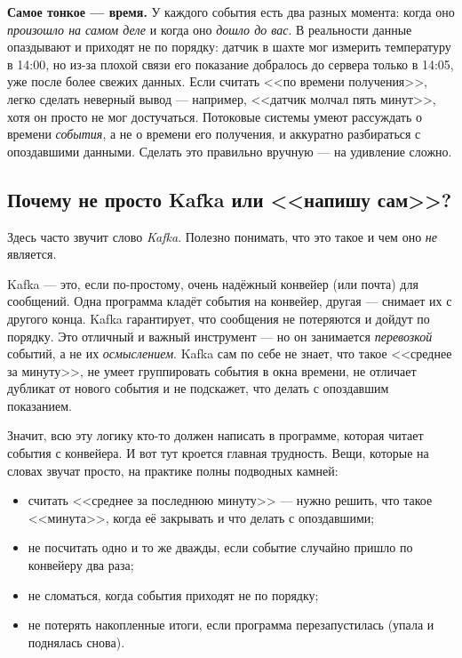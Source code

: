 \documentclass[11pt,a4paper]{article}
\begin{document}
\textbf{Самое тонкое --- время.} У каждого события есть два разных
момента: когда оно \emph{произошло на самом деле} и когда оно
\emph{дошло до вас}. В реальности данные опаздывают и приходят не по
порядку: датчик в шахте мог измерить температуру в 14:00, но из-за
плохой связи его показание добралось до сервера только в 14:05, уже
после более свежих данных. Если считать <<по времени получения>>, легко
сделать неверный вывод --- например, <<датчик молчал пять минут>>, хотя
он просто не мог достучаться. Потоковые системы умеют рассуждать о
времени \emph{события}, а не о времени его получения, и аккуратно
разбираться с опоздавшими данными. Сделать это правильно вручную ---
на удивление сложно.

\subsection{Почему не просто Kafka или <<напишу сам>>?}

Здесь часто звучит слово \emph{Kafka}. Полезно понимать, что это такое
и чем оно \emph{не} является.

Kafka --- это, если по-простому, очень надёжный конвейер (или почта)
для сообщений. Одна программа кладёт события на конвейер, другая ---
снимает их с другого конца. Kafka гарантирует, что сообщения не
потеряются и дойдут по порядку. Это отличный и важный инструмент --- но
он занимается \emph{перевозкой} событий, а не их \emph{осмыслением}.
Kafka сам по себе не знает, что такое <<среднее за минуту>>, не умеет
группировать события в окна времени, не отличает дубликат от нового
события и не подскажет, что делать с опоздавшим показанием.

Значит, всю эту логику кто-то должен написать в программе, которая
читает события с конвейера. И вот тут кроется главная трудность. Вещи,
которые на словах звучат просто, на практике полны подводных камней:

\begin{itemize}
\item считать <<среднее за последнюю минуту>> --- нужно решить, что
  такое <<минута>>, когда её закрывать и что делать с опоздавшими;
\item не посчитать одно и то же дважды, если событие случайно пришло
  по конвейеру два раза;
\item не сломаться, когда события приходят не по порядку;
\item не потерять накопленные итоги, если программа перезапустилась
  (упала и поднялась снова).
\end{itemize}
\end{document}
